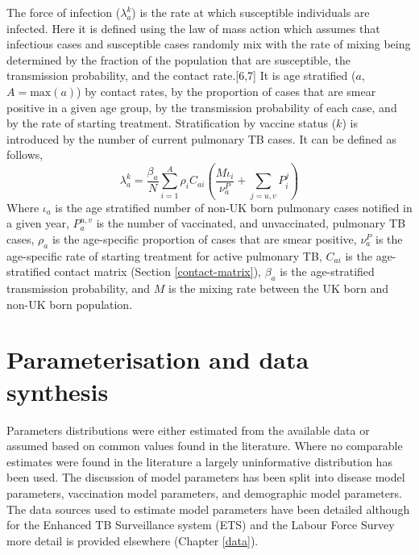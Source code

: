 \documentclass[11pt,twoside]{bristolthesis}
\begin{document}
  The force of infection (\(\lambda^k_a\)) is the rate at which susceptible individuals are infected. Here it is defined using the law of mass action which assumes that infectious cases and susceptible cases randomly mix with the rate of mixing being determined by the fraction of the population that are susceptible, the transmission probability, and the contact rate.{[}6,7{]} It is age stratified (\(a\), \(A = \text{max}(a)\)) by contact rates, by the proportion of cases that are smear positive in a given age group, by the transmission probability of each case, and by the rate of starting treatment. Stratification by vaccine status (\(k\)) is introduced by the number of current pulmonary TB cases. It can be defined as follows,
  \begin{equation}
  \lambda^k_a = \frac{\beta_a}{N} \sum\limits_{i=1}^{A} \rho_i C_{ai}\left(\frac{M\iota_i}{\nu_a^P} + \sum\limits_{j = u,v}P^j_i\right)
    \label{eq:force-of-infection}
  \end{equation}
  Where \(\iota_a\) is the age stratified number of non-UK born pulmonary cases notified in a given year, \(P^{u,v}_a\) is the number of vaccinated, and unvaccinated, pulmonary TB cases, \(\rho_a\) is the age-specific proportion of cases that are smear positive, \(\nu^P_a\) is the age-specific rate of starting treatment for active pulmonary TB, \(C_{ai}\) is the age-stratified contact matrix (Section \ref{contact-matrix}), \(\beta_a\) is the age-stratified transmission probability, and \(M\) is the mixing rate between the UK born and non-UK born population.
  
  \hypertarget{parameterisation-and-data-synthesis}{%
  \section{Parameterisation and data synthesis}\label{parameterisation-and-data-synthesis}}
  
  Parameters distributions were either estimated from the available data or assumed based on common values found in the literature. Where no comparable estimates were found in the literature a largely uninformative distribution has been used. The discussion of model parameters has been split into disease model parameters, vaccination model parameters, and demographic model parameters. The data sources used to estimate model parameters have been detailed although for the Enhanced TB Surveillance system (ETS) and the Labour Force Survey more detail is provided elsewhere (Chapter \ref{data}).
  
\end{document}
